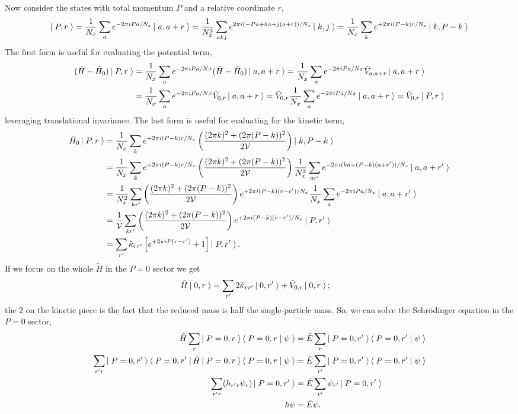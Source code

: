 Now consider the states with total momentum $P$ and a relative coordinate $r$,
\begin{align}
	\left|\;P,r\;\right\rangle 
	= \frac{1}{N_x} \sum_a e^{-2\pi iPa/N_x} \left|\;a,a+r\;\right\rangle
	= \frac{1}{N_x^3} \sum_{akj} e^{2\pi i (-P a+ka+j(a+r))/N_x} \left|\;k,j\;\right\rangle
	= \frac{1}{N_x} \sum_k e^{+2\pi i (P-k) r /N_x} \left|\;k, P-k\;\right\rangle
\end{align}
The first form is useful for evaluating the potential term,
\begin{align}
	(\tilde{H}-\tilde{H}_0)\left|\;P,r\;\right\rangle 
	&= \frac{1}{N_x} \sum_a e^{-2\pi iPa/Nx} (\tilde{H}-\tilde{H}_0)\left|\;a,a+r\;\right\rangle 
	= \frac{1}{N_x} \sum_a e^{-2\pi iPa/Nx} \tilde{V}_{a,a+r} \left|\;a,a+r\;\right\rangle
	\nonumber\\
	&= \frac{1}{N_x} \sum_a e^{-2\pi iPa/Nx} \tilde{V}_{0,r} \left|\;a,a+r\;\right\rangle
	= \tilde{V}_{0,r}  \frac{1}{N_x} \sum_a e^{-2\pi iPa/Nx} \left|\;a,a+r\;\right\rangle
	= \tilde{V}_{0,r} \left|\;P,r\;\right\rangle
\end{align}
leveraging translational invariance.
The last form is useful for evaluating for the kinetic term,
\begin{align}
    \tilde{H}_0 \left|\;P,r\;\right\rangle
    &=
		\frac{1}{N_x} \sum_k e^{+2\pi i(P-k) r/N_x} \left(\frac{(2\pi k)^2 + (2\pi (P-k))^2}{2 \mathcal{V}}\right) \left|\;k,P-k\;\right\rangle
	\nonumber\\
	&=
		\frac{1}{N_x} \sum_k e^{+2\pi i(P-k) r/N_x} \left(\frac{(2\pi k)^2 + (2\pi (P-k))^2}{2 \mathcal{V}}\right) \frac{1}{N_x^2} \sum_{ar'} e^{-2\pi i (ka + (P-k)(a+r'))/N_x} \left|\;a,a+r'\;\right\rangle
	\nonumber\\
	&=
		\frac{1}{N_x^2} \sum_{kr'} \left(\frac{(2\pi k)^2 + (2\pi (P-k))^2}{2 \mathcal{V}}\right) e^{+2\pi i(P-k) (r-r')/N_x} \frac{1}{N_x} \sum_{a} e^{-2\pi i Pa /N_x} \left|\;a,a+r'\;\right\rangle
	\nonumber\\
	&=
		\frac{1}{\mathcal{V}} \sum_{kr'} \left(\frac{(2\pi k)^2 + (2\pi (P-k))^2}{2 \mathcal{V}}\right) e^{+2\pi i(P-k) (r-r')/N_x} \left|\;P,r'\;\right\rangle
	\nonumber\\
	&=
	\sum_{r'} \tilde{\kappa}_{rr'} \left[ e^{+2\pi i P(r-r')} + 1 \right] \left|\;P,r'\;\right\rangle.
\end{align}
If we focus on the whole $\tilde{H}$ in the $P=0$ sector we get
\begin{align}
    \tilde{H} \left|\;0,r\;\right\rangle
    &=
			\sum_{r'} 2\tilde{\kappa}_{rr'} \left|\;0,r'\;\right\rangle
        +   \tilde{V}_{0,r} \left|\;0,r\;\right\rangle;
\end{align}
the $2$ on the kinetic piece is the fact that the reduced mass is half the single-particle mass.
So, we can solve the Schr\"{o}dinger equation in the $P=0$ sector,
\begin{align}
    \tilde{H} \sum_r \left|\;P=0,r\;\right\rangle\left\langle\;P=0,r\;\middle|\;\psi\;\right\rangle &= \tilde{E}\sum_r \left|\;P=0,r'\;\right\rangle\left\langle\;P=0,r'\;\middle|\;\psi\;\right\rangle
    \nonumber\\
    \sum_{r'r} \left|\;P=0, r'\;\right\rangle \left\langle\;P=0, r'\;\right| \tilde{H} \left|\;P=0,r\;\right\rangle\left\langle\;P=0,r\;\middle|\;\psi\;\right\rangle &= \tilde{E} \sum_{r'} \left|\;P=0, r'\;\right\rangle\left\langle\;P=0,r'\;\middle|\;\psi\;\right\rangle
    \nonumber\\
    \sum_{r'r} (h_{r'r} \psi_r) \left|\;P=0, r'\;\right\rangle &= \tilde{E} \sum_{r'} \psi_{r'} \left|\;P=0, r'\;\right\rangle
    \nonumber\\
    h \psi &= \tilde{E} \psi.
    \label{eq:two-body schrodinger equation}
\end{align}
